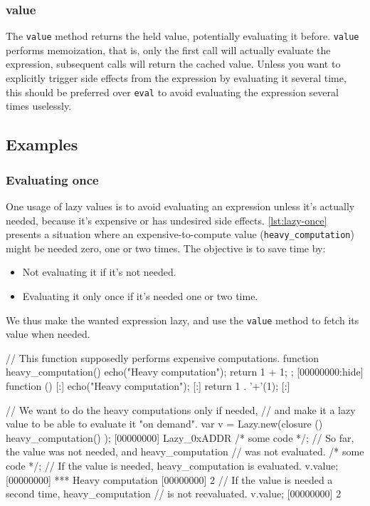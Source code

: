 \subsubsection{value}

The \lstinline|value| method returns the held value, potentially
evaluating it before. \lstinline|value| performs memoization, that is,
only the first call will actually evaluate the expression, subsequent
calls will return the cached value. Unless you want to explicitly
trigger side effects from the expression by evaluating it several
time, this should be preferred over \lstinline|eval| to avoid
evaluating the expression several times uselessly.

\subsection{Examples}

\subsubsection{Evaluating once}

One usage of lazy values is to avoid evaluating an expression unless
it's actually needed, because it's expensive or has undesired side
effects. \autoref{lst:lazy-once} presents a situation where an
expensive-to-compute value (\lstinline|heavy_computation|) might be
needed zero, one or two times. The objective is to save time by:

\begin{itemize}
\item Not evaluating it if it's not needed.
\item Evaluating it only once if it's needed one or two time.
\end{itemize}

We thus make the wanted expression lazy, and use the \lstinline|value|
method to fetch its value when needed.

\begin{urbiscript}[caption=, label=lst:lazy-once, float=\floatpos]
// This function supposedly performs expensive computations.
function heavy_computation()
{
  echo("Heavy computation");
  return 1 + 1;
};
[00000000:hide] function () {
[:]  echo("Heavy computation");
[:]  return 1 . '+'(1);
[:]}

// We want to do the heavy computations only if needed,
// and make it a lazy value to be able to evaluate it "on demand".
var v = Lazy.new(closure () { heavy_computation() });
[00000000] Lazy_0xADDR
/* some code */;
// So far, the value was not needed, and heavy_computation
// was not evaluated.
/* some code */;
// If the value is needed, heavy_computation is evaluated.
v.value;
[00000000] *** Heavy computation
[00000000] 2
// If the value is needed a second time, heavy_computation
// is not reevaluated.
v.value;
[00000000] 2
\end{urbiscript}

